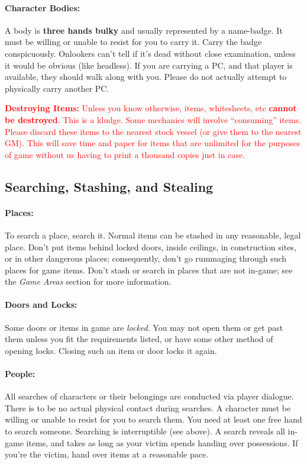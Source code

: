 \documentclass[sheet]{GL2020}
\begin{document}
\paragraph{Character Bodies:} A body is {\bf three hands bulky} and usually represented by a name-badge.  It must be willing or unable to resist for you to carry it.  Carry the badge conspicuously. Onlookers can't tell if it's dead without close examination, unless it would be obvious (like headless). If you are carrying a PC, and that player is available, they should walk along with you. Please do not actually attempt to physically carry another PC.

\textcolor{red}{\textbf{Destroying Items:} Unless you know otherwise, items, whitesheets, etc \textbf{cannot be destroyed}. This is a kludge. Some mechanics will involve ``consuming'' items. Please discard these items to the nearest stock vessel (or give them to the nearest GM). This will save time and paper for items that are unlimited for the purposes of game without us having to print a thousand copies just in case.}

\subsection{Searching, Stashing, and Stealing}

\paragraph{Places:} To search a place, search it.  Normal items can be stashed in any reasonable, legal place. Don't put items behind locked doors, inside ceilings, in construction sites, or in other dangerous places; consequently, don't go rummaging through such places for game items.  Don't stash or search in places that are not in-game; see the \emph{Game Areas} section for more information.

\paragraph{Doors and Locks:} Some doors or items in game are \emph{locked}. You may not open them or get past them unless you fit the requirements listed, or have some other method of opening locks. Closing such an item or door locks it again.

\paragraph{People:} All searches of characters or their belongings are conducted via player dialogue. There is to be no actual physical contact during searches. A character must be willing or unable to resist for you to search them.  You need at least one free hand to search someone. Searching is interruptible (see above).
A search reveals all in-game items, and takes as long as your victim spends handing over possessions. If you're the victim, hand over items at a reasonable pace.
\end{document}
